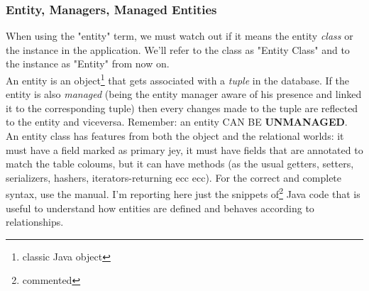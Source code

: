 \documentclass{article}
\begin{document}
			\subsubsection{Entity, Managers, Managed Entities}
				When using the "entity" term, we must watch out if it means the entity \textit{class} or the instance in the application. We'll refer to the class as "Entity Class" and to the instance as "Entity" from now on.\\
				An entity is an object\footnote{classic Java object} that gets associated with a \textit{tuple} in the database. If the entity is also \textit{managed} (being the entity manager aware of his presence and linked it to the corresponding tuple) then every changes made to the tuple are reflected to the entity and viceversa. Remember: an entity CAN BE \textbf{UNMANAGED}.  An entity class has features from both the object and the relational worlds: it must have a field marked as primary jey, it must have fields that are annotated to match the table coloums, but it can have methods (as the usual getters, setters, serializers, hashers, iterators-returning ecc ecc). For the correct and complete syntax, use the manual. I'm reporting here just the snippets of\footnote{commented} Java code that is useful to understand how entities are defined and behaves according to relationships.
\end{document}
